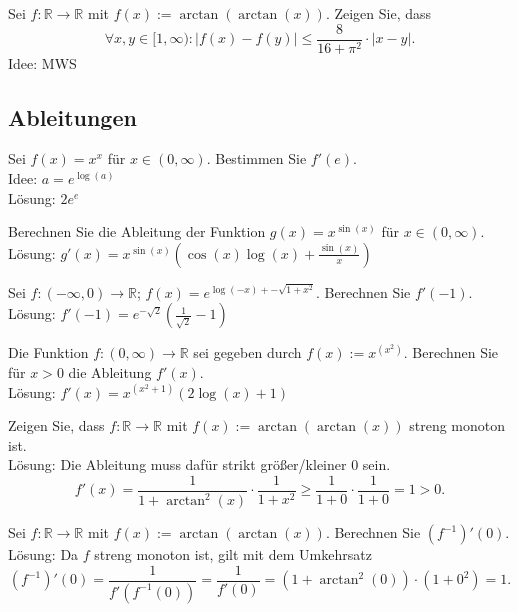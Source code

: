 Sei $f : \mathbb{R} \to \mathbb{R}$ mit $f(x) := \arctan(\arctan(x))$.
Zeigen Sie, dass
\begin{displaymath}
  \forall x,y \in [1,\infty) : |f(x) - f(y)| \leq \frac{8}{16 + \pi^2} \cdot |x-y|.
\end{displaymath}
Idee: MWS 

\subsection{Ableitungen}
Sei $f(x) = x^x$ für $x \in (0,\infty)$.
Bestimmen Sie $f'(e)$.\\
Idee: $a = e^{\log(a)}$\\
Lösung: $2e^e$

Berechnen Sie die Ableitung der Funktion $g(x) = x^{\sin(x)}$ für $x \in (0,\infty)$.\\
Lösung: $g'(x) = x^{\sin(x)} \left(\cos(x)\log(x) + \frac{\sin(x)}{x}\right)$

Sei $f : (-\infty, 0) \to \mathbb{R}$; $f(x) = e^{\log(-x) + - \sqrt{1 + x^2}}$.
Berechnen Sie $f'(-1)$.\\
Lösung: $f'(-1) = e^{-\sqrt{2}}\left(\frac{1}{\sqrt{2}} - 1\right)$

Die Funktion $f:(0,\infty) \to \mathbb{R}$ sei gegeben durch $f(x) := x^{(x^2)}$.
Berechnen Sie für $x > 0$ die Ableitung $f'(x)$.\\
Lösung: $f'(x) = x^{(x^2 + 1)} (2\log(x) + 1)$

Zeigen Sie, dass $f : \mathbb{R} \to \mathbb{R}$ mit $f(x) := \arctan(\arctan(x))$ streng monoton ist.\\
Lösung:
Die Ableitung muss dafür strikt größer/kleiner 0 sein.
\begin{displaymath}
  f'(x) = \frac{1}{1 + \arctan^2(x)} \cdot \frac{1}{1 + x^2} \geq \frac{1}{1 + 0} \cdot \frac{1}{1 + 0} = 1  > 0.
\end{displaymath}

Sei $f : \mathbb{R} \to \mathbb{R}$ mit $f(x) := \arctan(\arctan(x))$.
Berechnen Sie $(f^{-1})'(0)$.\\
Lösung:
Da $f$ streng monoton ist, gilt mit dem Umkehrsatz
\begin{displaymath}
  (f^{-1})'(0) = \frac{1}{f'(f^{-1}(0))} = \frac{1}{f'(0)} = (1 + \arctan^2(0)) \cdot (1 + 0^2) = 1.
\end{displaymath}

